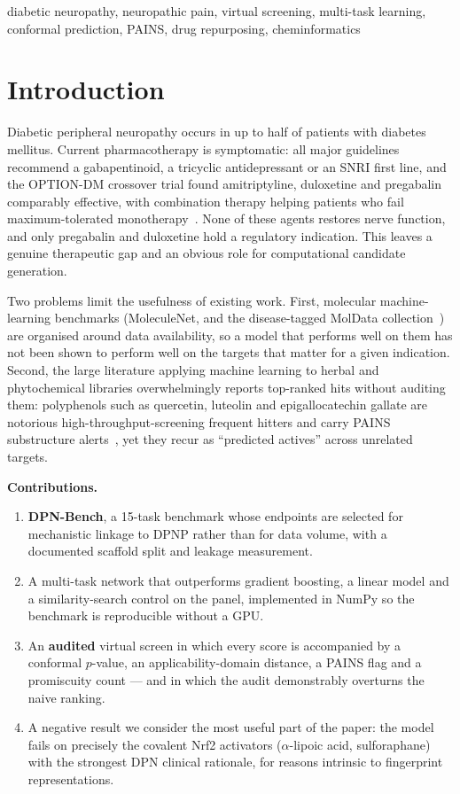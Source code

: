 \documentclass[conference]{IEEEtran}
\begin{document}
\begin{IEEEkeywords}
diabetic neuropathy, neuropathic pain, virtual screening, multi-task learning,
conformal prediction, PAINS, drug repurposing, cheminformatics
\end{IEEEkeywords}

\section{Introduction}

Diabetic peripheral neuropathy occurs in up to half of patients with diabetes
mellitus. Current pharmacotherapy is symptomatic: all major guidelines recommend
a gabapentinoid, a tricyclic antidepressant or an SNRI first line, and the
OPTION-DM crossover trial found amitriptyline, duloxetine and pregabalin
comparably effective, with combination therapy helping patients who fail
maximum-tolerated monotherapy~\cite{optiondm}. None of these agents restores
nerve function, and only pregabalin and duloxetine hold a regulatory indication.
This leaves a genuine therapeutic gap and an obvious role for computational
candidate generation.

Two problems limit the usefulness of existing work. First, molecular
machine-learning benchmarks (MoleculeNet, and the disease-tagged MolData
collection~\cite{moldata}) are organised around data availability, so a model
that performs well on them has not been shown to perform well on the targets
that matter for a given indication. Second, the large literature applying
machine learning to herbal and phytochemical libraries overwhelmingly reports
top-ranked hits without auditing them: polyphenols such as quercetin, luteolin
and epigallocatechin gallate are notorious high-throughput-screening frequent
hitters and carry PAINS substructure alerts~\cite{pains,baell}, yet they recur as
``predicted actives'' across unrelated targets.

\textbf{Contributions.}
\begin{enumerate}
\item \textbf{DPN-Bench}, a 15-task benchmark whose endpoints are selected for
mechanistic linkage to DPNP rather than for data volume, with a documented
scaffold split and leakage measurement.
\item A multi-task network that outperforms gradient boosting, a linear model
and a similarity-search control on the panel, implemented in NumPy so the
benchmark is reproducible without a GPU.
\item An \textbf{audited} virtual screen in which every score is accompanied by a
conformal $p$-value, an applicability-domain distance, a PAINS flag and a
promiscuity count --- and in which the audit demonstrably overturns the naive
ranking.
\item A negative result we consider the most useful part of the paper: the model
fails on precisely the covalent Nrf2 activators ($\alpha$-lipoic acid,
sulforaphane) with the strongest DPN clinical rationale, for reasons intrinsic
to fingerprint representations.
\end{enumerate}
\end{document}
